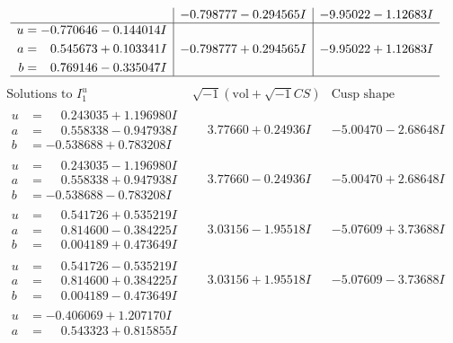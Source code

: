 \documentclass[1p]{elsarticle_modified}
\theoremstyle{definition}
\newcommand{\I}{\sqrt{-1}}
\begin{document}
$$\begin{array}{c|c|c}
 & -0.798777 - 0.294565 I & -9.95022 - 1.12683 I \\ \hline\begin{aligned}
u &= -0.770646 - 0.144014 I \\
a &= \phantom{-}0.545673 + 0.103341 I \\
b &= \phantom{-}0.769146 - 0.335047 I\end{aligned}
 & -0.798777 + 0.294565 I & -9.95022 + 1.12683 I\\
 \hline 
 \end{array}$$\newpage$$\begin{array}{c|c|c}  
\text{Solutions to }I^u_{1}& \I (\text{vol} + \sqrt{-1}CS) & \text{Cusp shape}\\
 \hline 
\begin{aligned}
u &= \phantom{-}0.243035 + 1.196980 I \\
a &= \phantom{-}0.558338 - 0.947938 I \\
b &= -0.538688 + 0.783208 I\end{aligned}
 & \phantom{-}3.77660 + 0.24936 I & -5.00470 - 2.68648 I \\ \hline\begin{aligned}
u &= \phantom{-}0.243035 - 1.196980 I \\
a &= \phantom{-}0.558338 + 0.947938 I \\
b &= -0.538688 - 0.783208 I\end{aligned}
 & \phantom{-}3.77660 - 0.24936 I & -5.00470 + 2.68648 I \\ \hline\begin{aligned}
u &= \phantom{-}0.541726 + 0.535219 I \\
a &= \phantom{-}0.814600 - 0.384225 I \\
b &= \phantom{-}0.004189 + 0.473649 I\end{aligned}
 & \phantom{-}3.03156 - 1.95518 I & -5.07609 + 3.73688 I \\ \hline\begin{aligned}
u &= \phantom{-}0.541726 - 0.535219 I \\
a &= \phantom{-}0.814600 + 0.384225 I \\
b &= \phantom{-}0.004189 - 0.473649 I\end{aligned}
 & \phantom{-}3.03156 + 1.95518 I & -5.07609 - 3.73688 I \\ \hline\begin{aligned}
u &= -0.406069 + 1.207170 I \\
a &= \phantom{-}0.543323 + 0.815855 I \\

\end{aligned}
\end{array}$$
\end{document}
